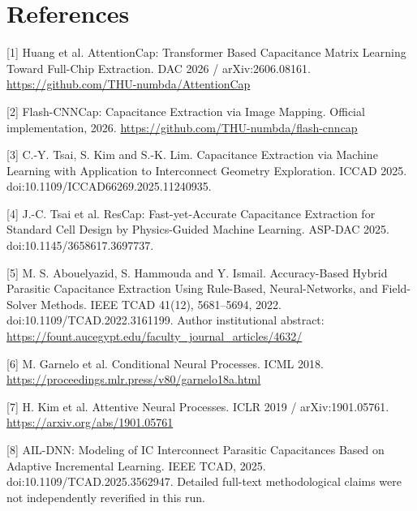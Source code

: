 \documentclass[10pt,twocolumn]{article}
\begin{document}
\section*{References}

[1] Huang et al. AttentionCap: Transformer Based Capacitance Matrix Learning Toward Full-Chip Extraction. DAC 2026 / arXiv:2606.08161. \url{https://github.com/THU-numbda/AttentionCap}

[2] Flash-CNNCap: Capacitance Extraction via Image Mapping. Official implementation, 2026. \url{https://github.com/THU-numbda/flash-cnncap}

[3] C.-Y. Tsai, S. Kim and S.-K. Lim. Capacitance Extraction via Machine Learning with Application to Interconnect Geometry Exploration. ICCAD 2025. doi:10.1109/ICCAD66269.2025.11240935.

[4] J.-C. Tsai et al. ResCap: Fast-yet-Accurate Capacitance Extraction for Standard Cell Design by Physics-Guided Machine Learning. ASP-DAC 2025. doi:10.1145/3658617.3697737.

[5] M. S. Abouelyazid, S. Hammouda and Y. Ismail. Accuracy-Based Hybrid Parasitic Capacitance Extraction Using Rule-Based, Neural-Networks, and Field-Solver Methods. IEEE TCAD 41(12), 5681--5694, 2022. doi:10.1109/TCAD.2022.3161199. Author institutional abstract: \url{https://fount.aucegypt.edu/faculty_journal_articles/4632/}

[6] M. Garnelo et al. Conditional Neural Processes. ICML 2018. \url{https://proceedings.mlr.press/v80/garnelo18a.html}

[7] H. Kim et al. Attentive Neural Processes. ICLR 2019 / arXiv:1901.05761. \url{https://arxiv.org/abs/1901.05761}

[8] AIL-DNN: Modeling of IC Interconnect Parasitic Capacitances Based on Adaptive Incremental Learning. IEEE TCAD, 2025. doi:10.1109/TCAD.2025.3562947. Detailed full-text methodological claims were not independently reverified in this run.
\end{document}

